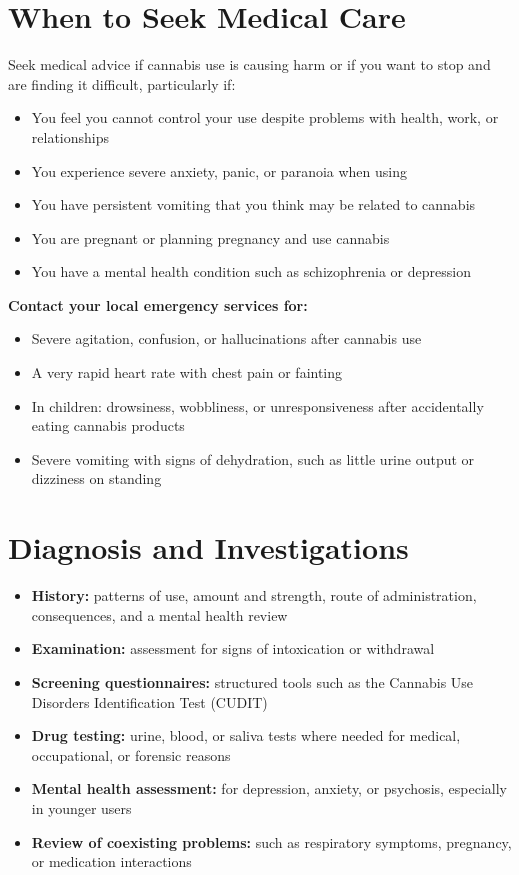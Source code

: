 \section*{When to Seek Medical Care}
Seek medical advice if cannabis use is causing harm or if you want to stop and are finding it difficult, particularly if:
\begin{itemize}
    \item You feel you cannot control your use despite problems with health, work, or relationships
    \item You experience severe anxiety, panic, or paranoia when using
    \item You have persistent vomiting that you think may be related to cannabis
    \item You are pregnant or planning pregnancy and use cannabis
    \item You have a mental health condition such as schizophrenia or depression
\end{itemize}
\textbf{Contact your local emergency services for:}
\begin{itemize}
    \item Severe agitation, confusion, or hallucinations after cannabis use
    \item A very rapid heart rate with chest pain or fainting
    \item In children: drowsiness, wobbliness, or unresponsiveness after accidentally eating cannabis products
    \item Severe vomiting with signs of dehydration, such as little urine output or dizziness on standing
\end{itemize}

\section*{Diagnosis and Investigations}
\begin{itemize}
    \item \textbf{History:} patterns of use, amount and strength, route of administration, consequences, and a mental health review
    \item \textbf{Examination:} assessment for signs of intoxication or withdrawal
    \item \textbf{Screening questionnaires:} structured tools such as the Cannabis Use Disorders Identification Test (CUDIT)
    \item \textbf{Drug testing:} urine, blood, or saliva tests where needed for medical, occupational, or forensic reasons
    \item \textbf{Mental health assessment:} for depression, anxiety, or psychosis, especially in younger users
    \item \textbf{Review of coexisting problems:} such as respiratory symptoms, pregnancy, or medication interactions
\end{itemize}

